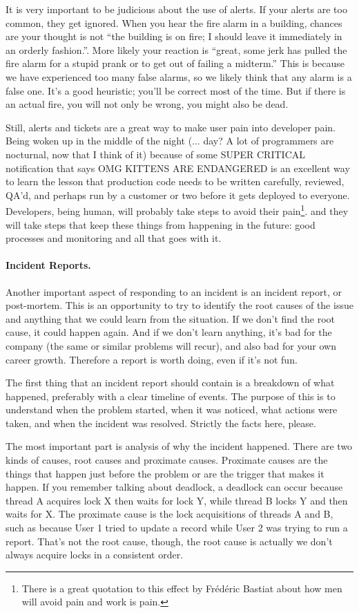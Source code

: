 \documentclass[a4paper]{report}
\begin{document}
It is very important to be judicious about the use of alerts. If your alerts are too common, they get ignored. When you hear the fire alarm in a building, chances are your thought is not ``the building is on fire; I should leave it immediately in an orderly fashion.''. More likely your reaction is ``great, some jerk has pulled the fire alarm for a stupid prank or to get out of failing a midterm.'' This is because we have experienced too many false alarms, so we likely think that any alarm is a false one. It's a good heuristic; you'll be correct most of the time. But if there is an actual fire, you will not only be wrong, you might also be dead.

Still, alerts and tickets are a great way to make user pain into developer pain. Being woken up in the middle of the night (... day? A lot of programmers are nocturnal, now that I think of it) because of some SUPER CRITICAL notification that says OMG KITTENS ARE ENDANGERED is an excellent way to learn the lesson that production code needs to be written carefully, reviewed, QA'd, and perhaps run by a customer or two before it gets deployed to everyone. Developers, being human, will probably take steps to avoid their pain\footnote{There is a great quotation to this effect by Fr\'ed\'eric Bastiat about how men will avoid pain and work is pain.}. and they will take steps that keep these things from happening in the future: good processes and monitoring and all that goes with it.

\paragraph{Incident Reports.} 
Another important aspect of responding to an incident is an incident report, or post-mortem. This is an opportunity to try to identify the root causes of the issue and anything that we could learn from the situation.  If we don't find the root cause, it could happen again. And if we don't learn anything, it's bad for the company (the same or similar problems will recur), and also bad for your own career growth. Therefore a report is worth doing, even if it's not fun.

The first thing that an incident report should contain is a breakdown of what happened, preferably with a clear timeline of events. The purpose of this is to understand when the problem started, when it was noticed, what actions were taken, and when the incident was resolved. Strictly the facts here, please.

The most important part is analysis of why the incident happened. There are two kinds of causes, root causes and proximate causes. Proximate causes are the things that happen just before the problem or are the trigger that makes it happen. If you remember talking about deadlock, a deadlock can occur because thread A acquires lock X then waits for lock Y, while thread B locks Y and then waits for X. The proximate cause is the lock acquisitions of threads A and B, such as because User 1 tried to update a record while User 2 was trying to run a report. That's not the root cause, though, the root cause is actually we don't always acquire locks in a consistent order.
\end{document}
